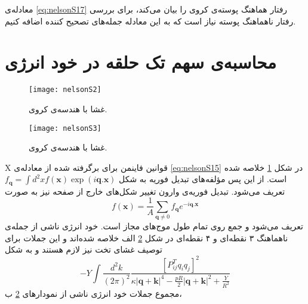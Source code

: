 معادله‌ی \ref{eq:nelsonS17}
 رفتار هماهنگ پوسته‌ی کروی را بیان می‌کند، برای بررسی رفتار ناهماهنگ پوسته نیاز است که به این معادله جمله‌های تصحیح کننده اضافه کنیم.
 \section{محاسبه‌ی سهم تک حلقه در خود انرژی}
 \begin{figure}[h]
\begin{center}
\texttt{[image: nelsonS2]}
\caption{
غشا با هندسه‌ی کروی.
}
\label{fig:nelsonS2}
\end{center}
\end{figure}

\begin{figure}[h]
\begin{center}
\texttt{[image: nelsonS3]}
\caption{
غشا با هندسه‌ی کروی.
}
\label{fig:nelsonS3}
\end{center}
\end{figure}
X
 قوانین فاینمن برای برگرفته شده از معادله‌ی \ref{eq:nelsonS15} 
 در شکل \ref{fig:nelsonS2}
 خلاصه شده است. از این پس مؤلفه‌های تبدیل فوریه به شکل
 $f_{\boldsymbol q}=\int d^2xf(\boldsymbol x)\exp(i\boldsymbol q.\boldsymbol x)$
 تعریف می‌شود. تبدیل فوریه‌ی وارون تغییر شکل‌های خارج از صفحه نیز به صورت
\begin{equation}
f(\boldsymbol x)=\frac{1}{A}\sum_{\boldsymbol q\neq 0}f_{\boldsymbol q}e^{-i\boldsymbol q.\boldsymbol x}
\label{eq:nelsonSٓ18}
\end{equation}
تعریف می‌شود و جمع روی تمام طول موج‌های مجاز است. خود انرژی ناشی از جمله‌ی ناهماهنگ ۳ نقطه‌ای و ۴ نقطه‌ای در شکل \ref{fig:nelsonS3}
الف خلاصه شده‌اند و این جملات برای توصیف غشای تخت نیز لازم هستند و به شکل 
\begin{equation}
-Y\int\frac{d^2k}{(2\pi)^2}\frac{\left[P_{ij}^Tq_iq_j\right]^2}{\kappa|\boldsymbol q + \boldsymbol k|^4-\frac{pR}{2}|\boldsymbol q + \boldsymbol k|^2+\frac{Y}{R^2}}
\label{eq:nelsonS19}
\end{equation}
 مجموع جملات خود انرژی ناشی از نمودارهای \ref{fig:nelsonS3}
 ب،

